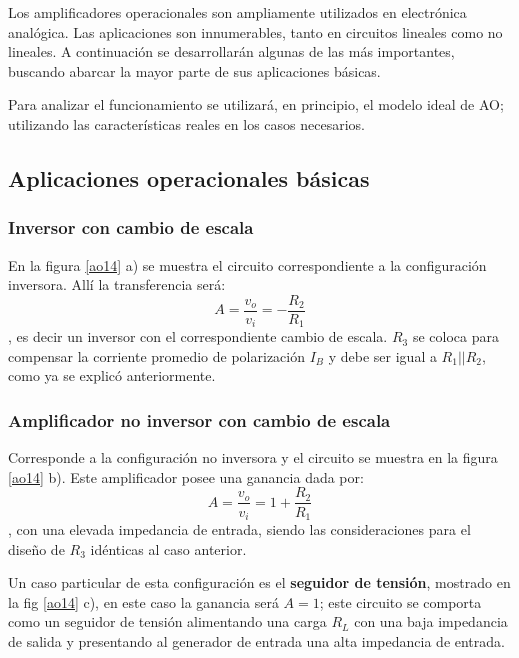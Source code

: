 \hspace{10pt} Los amplificadores operacionales son ampliamente utilizados en
electrónica analógica. Las aplicaciones son innumerables, tanto en
circuitos lineales como no lineales. A continuación  se
desarrollarán algunas de las más importantes,  buscando
abarcar la mayor parte de sus aplicaciones básicas.

Para analizar el funcionamiento se utilizará, en
principio, el modelo ideal de AO; utilizando las características
reales en los casos necesarios.


\subsection{Aplicaciones operacionales básicas}

\subsubsection{Inversor con cambio de escala}

\hspace{10pt} En la figura \ref{ao14} a) se muestra el circuito correspondiente a
la configuración inversora. Allí la transferencia será:
$$A=\frac{\displaystyle v_o}{\displaystyle v_i}=-\frac{\displaystyle
	R_2}{\displaystyle R_1}$$, es decir un inversor con el
correspondiente cambio de escala. $R_3$ se coloca para compensar la
corriente promedio de polarización $I_B$ y debe ser igual a
$R_1||R_2$, como ya se explicó anteriormente.

\subsubsection{Amplificador no inversor con cambio de escala}

\hspace{10pt} Corresponde a la configuración no inversora y el circuito se muestra
en la figura \ref{ao14} b). Este amplificador posee una ganancia
dada por: $$A=\frac{\displaystyle v_o}{\displaystyle
	v_i}=1+\frac{\displaystyle R_2}{\displaystyle R_1}$$, con una
elevada impedancia de entrada, siendo las consideraciones para el
diseño de $R_3$ idénticas al caso anterior.

Un caso particular de esta configuración es el \textbf{seguidor de
	tensión}, mostrado en la fig \ref{ao14} c), en este caso la ganancia
será $A=1$; este circuito se comporta como un seguidor de tensión
alimentando una carga $R_L$ con una baja impedancia de salida y
presentando al generador de entrada una alta impedancia de entrada.

